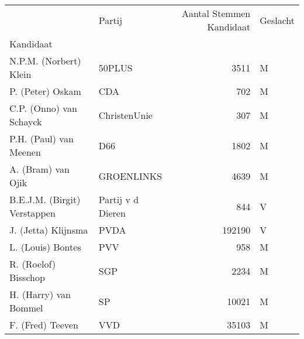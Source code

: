 \begin{tabular}{llrl}
\toprule
{} &                 Partij &  Aantal Stemmen Kandidaat & Geslacht \\
Kandidaat                    &                        &                           &          \\
\midrule
N.P.M. (Norbert) Klein       &                 50PLUS &                      3511 &        M \\
P. (Peter) Oskam             &                    CDA &                       702 &        M \\
C.P. (Onno) van Schayck      &           ChristenUnie &                       307 &        M \\
P.H. (Paul) van Meenen       &                    D66 &                      1802 &        M \\
A. (Bram) van Ojik           &             GROENLINKS &                      4639 &        M \\
B.E.J.M. (Birgit) Verstappen &  Partij v d Dieren &                       844 &        V \\
J. (Jetta) Klijnsma          &                   PVDA &                    192190 &        V \\
L. (Louis) Bontes            &                    PVV &                       958 &        M \\
R. (Roelof) Bisschop         &                    SGP &                      2234 &        M \\
H. (Harry) van Bommel        &                     SP &                     10021 &        M \\
F. (Fred) Teeven             &                    VVD &                     35103 &        M \\
\bottomrule
\end{tabular}
